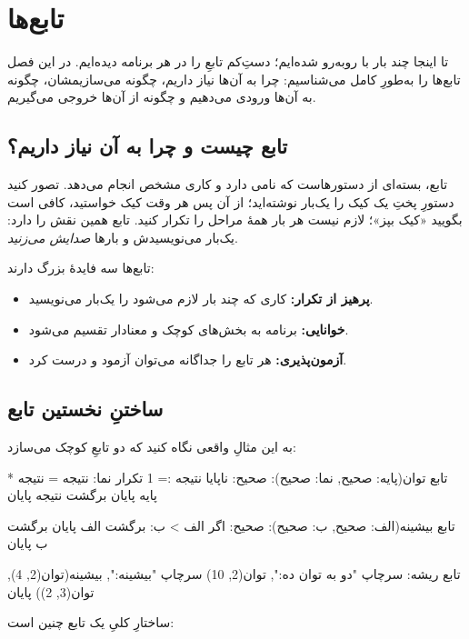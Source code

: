 \chapter{تابع‌ها}%
\label{ch:functions}

تا اینجا چند بار با  روبه‌رو شده‌ایم؛ دستِ‌کم تابعِ 
را در هر برنامه دیده‌ایم. در این فصل تابع‌ها را به‌طورِ کامل می‌شناسیم: چرا به
آن‌ها نیاز داریم، چگونه می‌سازیمشان، چگونه به آن‌ها ورودی می‌دهیم و چگونه از
آن‌ها خروجی می‌گیریم.

\section{تابع چیست و چرا به آن نیاز داریم؟}

تابع، بسته‌ای از دستورهاست که نامی دارد و کاری مشخص انجام می‌دهد. تصور کنید
دستورِ پختِ یک کیک را یک‌بار نوشته‌اید؛ از آن پس هر وقت کیک خواستید، کافی است
بگویید «کیک بپز»؛ لازم نیست هر بار همهٔ مراحل را تکرار کنید. تابع همین نقش
را دارد: یک‌بار می‌نویسیدش و بارها \emph{صدایش می‌زنید}.

تابع‌ها سه فایدهٔ بزرگ دارند:
\begin{itemize}
  \item \textbf{پرهیز از تکرار:} کاری که چند بار لازم می‌شود را یک‌بار
        می‌نویسید.
  \item \textbf{خوانایی:} برنامه به بخش‌های کوچک و معنادار تقسیم می‌شود.
  \item \textbf{آزمون‌پذیری:} هر تابع را جداگانه می‌توان آزمود و درست کرد.
\end{itemize}

\section{ساختنِ نخستین تابع}

به این مثالِ واقعی نگاه کنید که دو تابعِ کوچک می‌سازد:

\begin{salamfa}
تابع توان(پایه: صحیح, نما: صحیح): صحیح:
    ناپایا نتیجه := 1
    تکرار نما:
        نتیجه = نتیجه * پایه
    پایان
    برگشت نتیجه
پایان

تابع بیشینه(الف: صحیح, ب: صحیح): صحیح:
    اگر الف > ب:
        برگشت الف
    پایان
    برگشت ب
پایان

تابع ریشه:
    سرچاپ "دو به توان ده:", توان(2, 10)
    سرچاپ "بیشینه:", بیشینه(توان(2, 4), توان(3, 2))
پایان
\end{salamfa}

ساختارِ کلیِ یک تابع چنین است:

